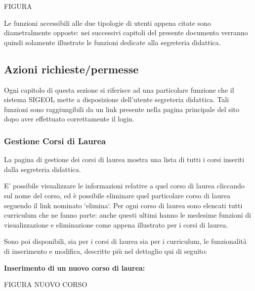 \documentclass[11pt,a4paper]{article}
\begin{document}
\begin{LARGE}FIGURA\end{LARGE}

Le funzioni accessibili alle due tipologie di utenti appena citate sono diametralmente opposte: nei successivi capitoli del presente documento verranno quindi solamente illustrate le funzioni dedicate alla segreteria didattica.
\subsection{Azioni richieste/permesse}
Ogni capitolo di questa sezione si riferisce ad una particolare funzione che il sistema SIGEOL mette a disposizione dell'utente segreteria didattica. Tali funzioni sono raggiungibili da un link presente nella pagina principale del sito dopo aver effettuato correttamente il login.
\subsubsection{Gestione Corsi di Laurea}
La pagina di gestione dei corsi di laurea mostra una lista di tutti i corsi inseriti dalla segreteria didattica.

E' possibile visualizzare le informazioni relative a quel corso di laurea cliccando sul nome del corso, ed è possibile eliminare quel particolare corso di laurea seguendo il link nominato `elimina`.
Per ogni corso di laurea sono elencati tutti curriculum che ne fanno parte: anche questi ultimi hanno le medesime funzioni di visualizzazione e eliminazione come appena illustrato per i corsi di laurea.

Sono poi disponibili, sia per i corsi di laurea sia per i curriculum, le funzionalità di inserimento e modifica, descritte più nel dettaglio qui di seguito:
\newline \newline
\begin{large}\textbf{Inserimento di un nuovo corso di laurea:}\end{large}

\begin{LARGE}FIGURA NUOVO CORSO\end{LARGE}
\end{document}
